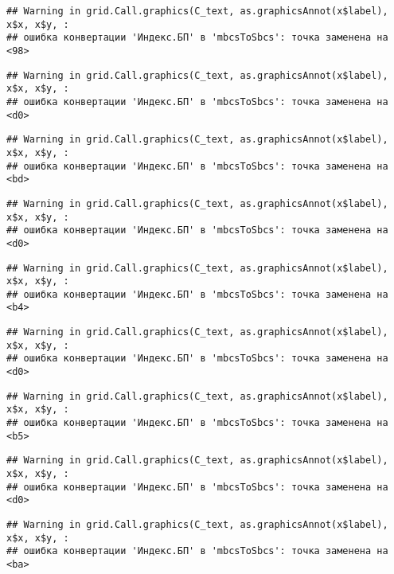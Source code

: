 \documentclass[
]{article}
\begin{document}
\begin{verbatim}
## Warning in grid.Call.graphics(C_text, as.graphicsAnnot(x$label), x$x, x$y, :
## ошибка конвертации 'Индекс.БП' в 'mbcsToSbcs': точка заменена на <98>
\end{verbatim}

\begin{verbatim}
## Warning in grid.Call.graphics(C_text, as.graphicsAnnot(x$label), x$x, x$y, :
## ошибка конвертации 'Индекс.БП' в 'mbcsToSbcs': точка заменена на <d0>
\end{verbatim}

\begin{verbatim}
## Warning in grid.Call.graphics(C_text, as.graphicsAnnot(x$label), x$x, x$y, :
## ошибка конвертации 'Индекс.БП' в 'mbcsToSbcs': точка заменена на <bd>
\end{verbatim}

\begin{verbatim}
## Warning in grid.Call.graphics(C_text, as.graphicsAnnot(x$label), x$x, x$y, :
## ошибка конвертации 'Индекс.БП' в 'mbcsToSbcs': точка заменена на <d0>
\end{verbatim}

\begin{verbatim}
## Warning in grid.Call.graphics(C_text, as.graphicsAnnot(x$label), x$x, x$y, :
## ошибка конвертации 'Индекс.БП' в 'mbcsToSbcs': точка заменена на <b4>
\end{verbatim}

\begin{verbatim}
## Warning in grid.Call.graphics(C_text, as.graphicsAnnot(x$label), x$x, x$y, :
## ошибка конвертации 'Индекс.БП' в 'mbcsToSbcs': точка заменена на <d0>
\end{verbatim}

\begin{verbatim}
## Warning in grid.Call.graphics(C_text, as.graphicsAnnot(x$label), x$x, x$y, :
## ошибка конвертации 'Индекс.БП' в 'mbcsToSbcs': точка заменена на <b5>
\end{verbatim}

\begin{verbatim}
## Warning in grid.Call.graphics(C_text, as.graphicsAnnot(x$label), x$x, x$y, :
## ошибка конвертации 'Индекс.БП' в 'mbcsToSbcs': точка заменена на <d0>
\end{verbatim}

\begin{verbatim}
## Warning in grid.Call.graphics(C_text, as.graphicsAnnot(x$label), x$x, x$y, :
## ошибка конвертации 'Индекс.БП' в 'mbcsToSbcs': точка заменена на <ba>
\end{verbatim}
\end{document}
